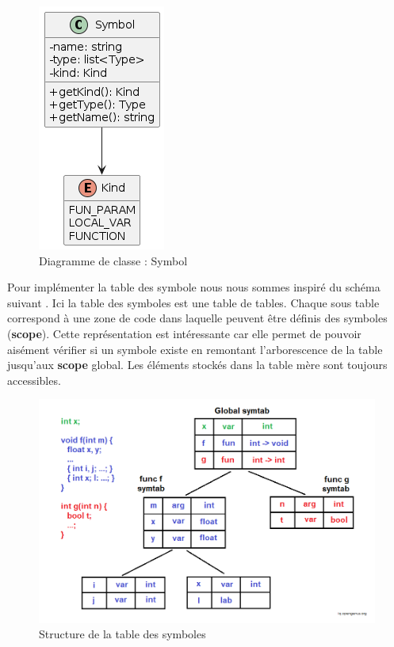 \documentclass[a4paper]{article}%
\begin{document}
\begin{figure}[h!]
  \begin{center}
  \includegraphics[scale=0.5]{../ressources/diagrams/symbol.png}
  \caption{Diagramme de classe : Symbol}
  \end{center}
\end{figure}

Pour implémenter la table des symbole nous nous sommes inspiré du schéma suivant
\cite{symtableGenius}. Ici la table des symboles est une table de tables.
Chaque sous table correspond à une zone de code dans laquelle peuvent être
définis des symboles (\textbf{scope}). Cette représentation est intéressante car
elle permet de pouvoir aisément vérifier si un symbole existe en remontant
l'arborescence de la table jusqu'aux \textbf{scope} global. Les éléments stockés
dans la table mère sont toujours accessibles.
\clearpage

\begin{figure}[h!]
  \begin{center}
  \includegraphics[scale=0.5]{./img/symtable.png}
  \caption{Structure de la table des symboles}
  \end{center}
\end{figure}
\end{document}
